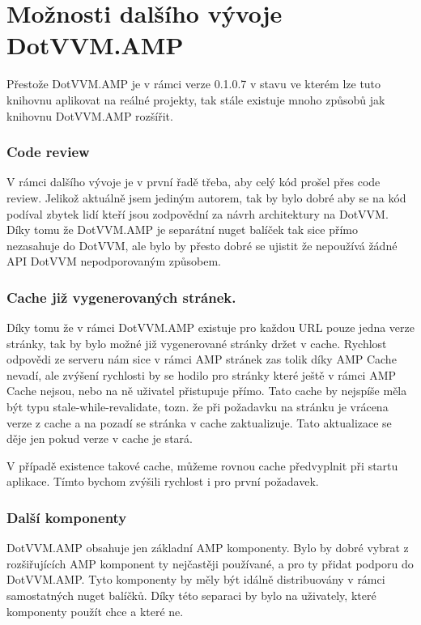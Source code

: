\chapter{Možnosti dalšího vývoje DotVVM.AMP}
Přestože DotVVM.AMP je v rámci verze 0.1.0.7 v stavu ve kterém lze tuto knihovnu aplikovat na reálné projekty, tak stále existuje mnoho způsobů jak knihovnu DotVVM.AMP rozšířit.

\subsection{Code review}
V rámci dalšího vývoje je v první řadě třeba, aby celý kód prošel přes code review. Jelikož aktuálně jsem jediným autorem, tak by bylo dobré aby se na kód podíval zbytek lidí kteří jsou zodpovědní za návrh architektury na DotVVM. Díky tomu že DotVVM.AMP je separátní nuget balíček tak sice přímo nezasahuje do DotVVM, ale bylo by přesto dobré se ujistit že nepoužívá žádné API DotVVM nepodporovaným způsobem.

\subsection{Cache již vygenerovaných stránek.}
Díky tomu že v rámci DotVVM.AMP existuje pro každou URL pouze jedna verze stránky, tak by bylo možné již vygenerované stránky držet v cache. Rychlost odpovědi ze serveru nám sice v rámci AMP stránek zas tolik díky AMP Cache nevadí, ale zvýšení rychlosti by se hodilo pro stránky které ještě v rámci AMP Cache nejsou, nebo na ně uživatel přistupuje přímo.
Tato cache by nejspíše měla být typu stale-while-revalidate, tozn. že při požadavku na stránku je vrácena verze z cache a na pozadí se stránka v cache zaktualizuje. Tato aktualizace se děje jen pokud verze v cache je stará.

V případě existence takové cache, můžeme rovnou cache předvyplnit při startu aplikace. Tímto bychom zvýšili rychlost i pro první požadavek.

\subsection{Další komponenty}
DotVVM.AMP obsahuje jen základní AMP komponenty. Bylo by dobré vybrat z rozšiřujících AMP komponent ty nejčastěji používané, a pro ty přidat podporu do DotVVM.AMP. Tyto komponenty by měly být idálně distribuovány v rámci samostatných nuget balíčků. Díky této separaci by bylo na uživately, které komponenty použít chce a které ne.


